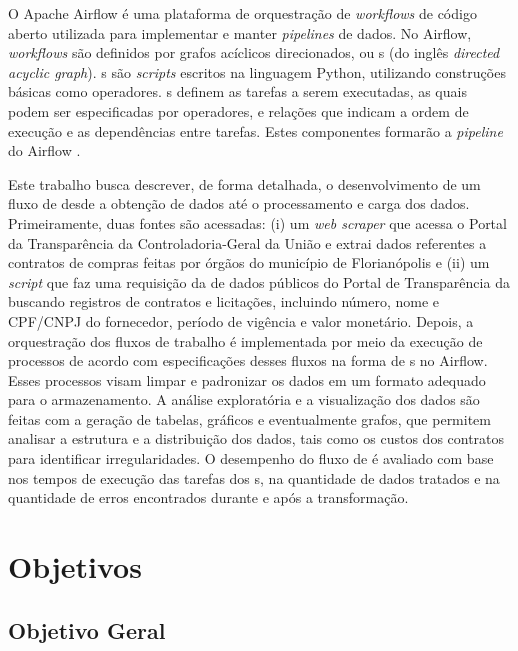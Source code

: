 \documentclass[
	12pt,				%
	oneside,			%
	a4paper,			%
	chapter=TITLE,		%
	section=TITLE,		%
	english,			%
	brazil				%
	]{abntex2}
\begin{document}
O Apache Airflow é uma plataforma de orquestração de \textit{workflows} de código aberto utilizada para implementar e manter \textit{pipelines} de dados. No Airflow, \textit{workflows} são definidos por grafos acíclicos direcionados, ou s (do inglês \textit{directed acyclic graph}). s são \textit{scripts} escritos na linguagem Python, utilizando construções básicas como operadores. s definem as tarefas a serem executadas, as quais podem ser especificadas por operadores, e relações que indicam a ordem de execução e as dependências entre tarefas. Estes componentes formarão a \textit{pipeline} do Airflow \cite{finnigan2021building}.

Este trabalho busca descrever, de forma detalhada, o desenvolvimento de um fluxo de  desde a obtenção de dados até o processamento e carga dos dados. Primeiramente, duas fontes são acessadas: (i) um \textit{web scraper} que acessa o Portal da Transparência da Controladoria-Geral da União e extrai dados referentes a contratos de compras feitas por órgãos do município de Florianópolis e (ii) um \textit{script} que faz uma requisição da  de dados públicos do Portal de Transparência da  buscando registros de contratos e licitações, incluindo número, nome e CPF/CNPJ do fornecedor, período de vigência e valor monetário. Depois, a orquestração dos fluxos de trabalho é implementada por meio da execução de processos de acordo com especificações desses fluxos na forma de s no Airflow. Esses processos visam limpar e padronizar os dados em
um formato adequado para o armazenamento. A análise exploratória e a visualização dos dados são feitas com a geração de tabelas, gráficos e eventualmente grafos, que permitem analisar a estrutura e a distribuição dos dados, tais como os custos dos contratos para identificar irregularidades. O desempenho do fluxo de  é avaliado com base nos tempos de execução das tarefas dos s, na quantidade de dados tratados e na quantidade de erros encontrados durante e após a transformação.

\section{Objetivos}
\subsection{Objetivo Geral}
\end{document}

